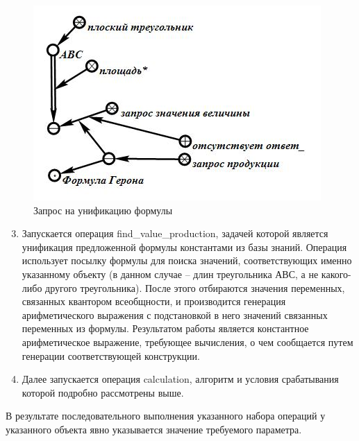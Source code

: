 \begin{figure}[H]
	\includegraphics[scale=0.5]{images/part7/chapter_learning_systems/step5.jpg}
	\caption{Запрос на унификацию формулы}
	\label{fig:step5}
\end{figure}

\begin{enumerate}
	\setcounter{enumi}{2}
	\item
	Запускается операция find\_value\_production, задачей которой является унификация предложенной формулы константами из базы знаний. Операция использует посылку формулы для поиска значений, соответствующих именно указанному объекту (в данном случае -- длин треугольника АВС, а не какого-либо другого треугольника). После этого отбираются значения переменных, связанных квантором всеобщности, и производится генерация арифметического выражения с подстановкой в него значений связанных переменных из формулы. Результатом работы является константное арифметическое выражение, требующее вычисления, о чем сообщается путем генерации соответствующей конструкции.
	\item
	Далее запускается операция calculation, алгоритм и условия срабатывания которой подробно рассмотрены выше.
\end{enumerate}

В результате последовательного выполнения указанного набора операций у указанного объекта явно указывается значение требуемого параметра.
